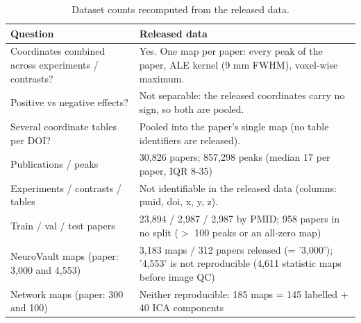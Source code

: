 \begin{table}[t]
\centering
\small
\caption{Dataset counts recomputed from the released data.}
\label{tab:a4_counts}
\begin{tabular}{p{5.2cm}p{9cm}}
\toprule
Question & Released data \\
\midrule
Coordinates combined across experiments / contrasts? & Yes. One map per paper: every peak of the paper, ALE kernel (9 mm FWHM), voxel-wise maximum. \\
Positive vs negative effects? & Not separable: the released coordinates carry no sign, so both are pooled. \\
Several coordinate tables per DOI? & Pooled into the paper's single map (no table identifiers are released). \\
Publications / peaks & 30,826 papers; 857,298 peaks (median 17 per paper, IQR 8-35) \\
Experiments / contrasts / tables & Not identifiable in the released data (columns: pmid, doi, x, y, z). \\
Train / val / test papers & 23,894 / 2,987 / 2,987 by PMID; 958 papers in no split ($>$ 100 peaks or an all-zero map) \\
NeuroVault maps (paper: 3,000 and 4,553) & 3,183 maps / 312 papers released (= '3,000'); '4,553' is not reproducible (4,611 statistic maps before image QC) \\
Network maps (paper: 300 and 100) & Neither reproducible: 185 maps = 145 labelled + 40 ICA components \\
\bottomrule
\end{tabular}
\end{table}

